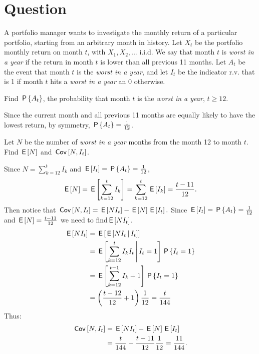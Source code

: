 \section{Question}

A portfolio manager wants to investigate the monthly return of a particular portfolio, starting from an arbitrary month in history.  Let $X_t$ be the portfolio monthly return on month $t$, with $X_1, X_2, . . . $ i.i.d. We say that month $t$ is  \textit{worst in a year} if the return in month $t$ is lower than all previous 11 months. Let $A_t$ be the event that month $t$ is the \textit{worst in a year}, and let $I_{t}$ be the indicator r.v. that is 1 if month $t$ hits a \textit{worst in a year} an 0 otherwise.

\begin{exercise}[0.5]
Find $\P{A_t}$, the probability that month $t$ is the \textit{worst in a year}, $t\geq 12$.
\begin{solution}
 Since the current month and all previous 11 months are equally likely to have the lowest return, by symmetry, $\P{A_t}=\frac{1}{12}$.
\end{solution}
\end{exercise}


\begin{exercise}[2]
 Let $N$ be the number of \textit{worst in a year} months from the month 12 to month $t$. Find $\E{N}$ and $\cov{N, I_t}$.
\begin{solution}
  Since $N=\sum_{k=12}^t I_k$ and $\E{I_t}=\P{A_t}=\frac{1}{12}$, $$\E{N}=\E{\sum_{k=12}^t I_k}=\sum_{k=12}^t \E{I_k}=\frac{t-11}{12}.$$
    Then notice that $\cov{N, I_t}=\E{NI_t}-\E{N}\E{I_t}.$ Since $\E{I_t}=\P{A_t}=\frac{1}{12}$ and $\E{N}=\frac{t-11}{12}$ we need to find$\E{NI_t}$.
     \begin{align*}
        \E{NI_t}&=\E{\E{NI_t \given I_t}}\\
        &=\E{\sum_{k=12}^t I_k I_t \given I_t=1}\P{I_t=1} \\
         &=\E{\sum_{k=12}^{t-1} I_k+1} \P{I_t=1}\\
         &=\left(\frac{t-12}{12}+1\right)\frac{1}{12} =\frac{t}{144}
    \end{align*}
    Thus:
    \begin{align*}
        \cov{N, I_t}&=\E{NI_t}-\E{N}\E{I_t}\\
        &=\frac{t}{144}-\frac{t-11}{12}\frac{1}{12} =\frac{11}{144}.
    \end{align*}
\end{solution}
\end{exercise}


